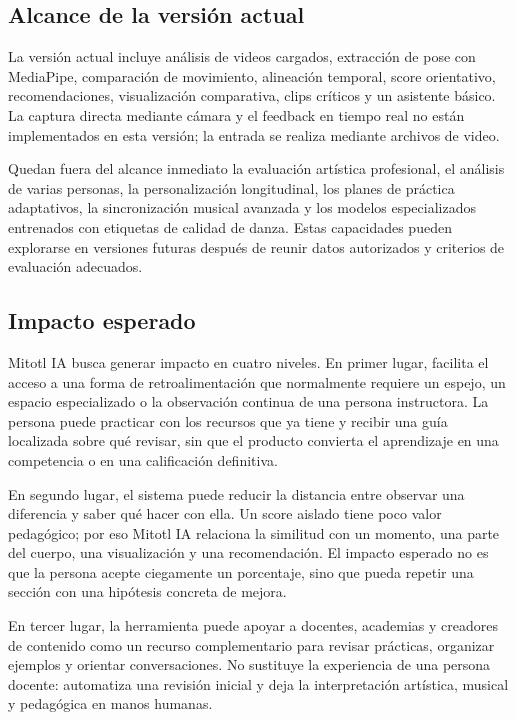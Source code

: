 \documentclass[12pt,a4paper]{article}
\begin{document}
\subsection{Alcance de la versión actual}
La versión actual incluye análisis de videos cargados, extracción de pose con MediaPipe, comparación de movimiento, alineación temporal, score orientativo, recomendaciones, visualización comparativa, clips críticos y un asistente básico. La captura directa mediante cámara y el feedback en tiempo real no están implementados en esta versión; la entrada se realiza mediante archivos de video.

Quedan fuera del alcance inmediato la evaluación artística profesional, el análisis de varias personas, la personalización longitudinal, los planes de práctica adaptativos, la sincronización musical avanzada y los modelos especializados entrenados con etiquetas de calidad de danza. Estas capacidades pueden explorarse en versiones futuras después de reunir datos autorizados y criterios de evaluación adecuados.

\subsection{Impacto esperado}
Mitotl IA busca generar impacto en cuatro niveles. En primer lugar, facilita el acceso a una forma de retroalimentación que normalmente requiere un espejo, un espacio especializado o la observación continua de una persona instructora. La persona puede practicar con los recursos que ya tiene y recibir una guía localizada sobre qué revisar, sin que el producto convierta el aprendizaje en una competencia o en una calificación definitiva.

En segundo lugar, el sistema puede reducir la distancia entre observar una diferencia y saber qué hacer con ella. Un score aislado tiene poco valor pedagógico; por eso Mitotl IA relaciona la similitud con un momento, una parte del cuerpo, una visualización y una recomendación. El impacto esperado no es que la persona acepte ciegamente un porcentaje, sino que pueda repetir una sección con una hipótesis concreta de mejora.

En tercer lugar, la herramienta puede apoyar a docentes, academias y creadores de contenido como un recurso complementario para revisar prácticas, organizar ejemplos y orientar conversaciones. No sustituye la experiencia de una persona docente: automatiza una revisión inicial y deja la interpretación artística, musical y pedagógica en manos humanas.
\end{document}
